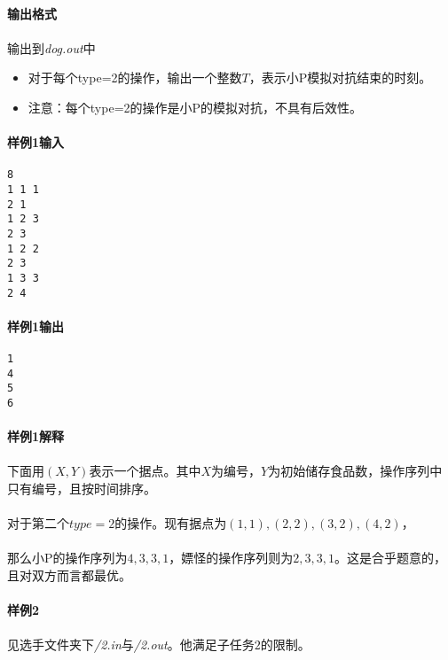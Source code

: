 \documentclass[UTF8]{ctexart}
\begin{document}
\paragraph{输出格式}
\paragraph{}输出到\emph{dog.out}中
\begin{itemize}
	\item 对于每个type=2的操作，输出一个整数$T$，表示小P模拟对抗结束的时刻。
	\item 注意：每个type=2的操作是小P的模拟对抗，不具有后效性。
\end{itemize}
\clearpage
\paragraph{样例1输入}
\begin{lstlisting}
8
1 1 1
2 1
1 2 3
2 3
1 2 2
2 3
1 3 3
2 4
\end{lstlisting}
\paragraph{样例1输出}
\begin{lstlisting}
1
4
5
6
\end{lstlisting}
\paragraph{样例1解释}
\paragraph{}下面用$(X,Y)$表示一个据点。其中$X$为编号，$Y$为初始储存食品数，操作序列中只有编号，且按时间排序。
\paragraph{}对于第二个$type=2$的操作。现有据点为$(1,1),(2,2),(3,2),(4,2)$，
\paragraph{}那么小P的操作序列为$4,3,3,1$，嫖怪的操作序列则为$2,3,3,1$。这是合乎题意的，且对双方而言都最优。
\paragraph{样例2}
\paragraph{}见选手文件夹下\emph{/2.in}与\emph{/2.out}。他满足子任务$2$的限制。
\end{document}
